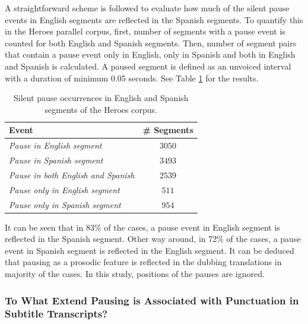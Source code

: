 A straightforward scheme is followed to evaluate how much of the silent pause events in English segments are reflected in the Spanish segments. To quantify this in the Heroes parallel corpus, first, number of segments with a pause event is counted for both English and Spanish segments. Then, number of segment pairs that contain a pause event only in English, only in Spanish and both in English and Spanish is calculated. A paused segment is defined as an unvoiced interval with a duration of minimum 0.05 seconds. See Table \ref{table:pausing} for the results. 

\begin{table}[ht]
\centering
\begin{tabular}{lc}
\hline
\textbf{Event} & \textbf{\# Segments} \\ \hline
\textit{Pause in English segment} &  $3050$ \\
\textit{Pause in Spanish segment} & $3493$  \\
\textit{Pause in both English and Spanish} & $2539$  \\ 
\textit{Pause only in English segment} & $511$  \\
\textit{Pause only in Spanish segment} & $954$  \\ \hline
\end{tabular}
\caption{\label{table:pausing}Silent pause occurrences in English and Spanish segments of the Heroes corpus.}
\end{table}

It can be seen that in 83\% of the cases, a pause event in English segment is reflected in the Spanish segment. Other way around, in 72\% of the cases, a pause event in Spanish segment is reflected in the English segment. It can be deduced that pausing as a prosodic feature is reflected in the dubbing translations in majority of the cases. In this study, positions of the pauses are ignored. 

\subsubsection{To What Extend Pausing is Associated with Punctuation in Subtitle Transcripts?}

